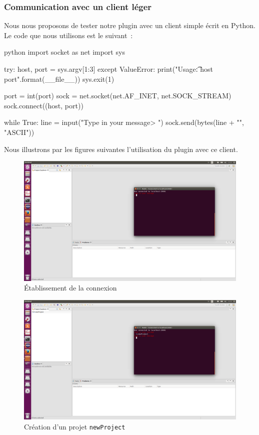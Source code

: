 \subsubsection{Communication avec un client léger}

Nous nous proposons de tester notre plugin avec un client simple écrit en Python.
Le code que nous utilisons est le suivant~:

\begin{imtaCode}{python}
import socket as net
import sys


try:
    host, port = sys.argv[1:3]
except ValueError:
    print("Usage:\n\t{} host port".format(__file__))
    sys.exit(1)

port = int(port)
sock = net.socket(net.AF_INET, net.SOCK_STREAM)
sock.connect((host, port))

while True:
    line = input("Type in your message\n> ")
    sock.send(bytes(line + "\n", "ASCII"))
\end{imtaCode}

Nous illustrons par les figures suivantes l'utilisation du plugin avec ce client.

\begin{figure}[H]
    \centering
    \includegraphics{pictures/rodinCommunication1.png}
    \caption{Établissement de la connexion}
    \label{fig:rodinCommunication1}
\end{figure}

\begin{figure}[H]
    \centering
    \includegraphics{pictures/rodinCommunication2.png}
    \caption{Création d'un projet \texttt{newProject}}
    \label{fig:rodinCommunication2}
\end{figure}

